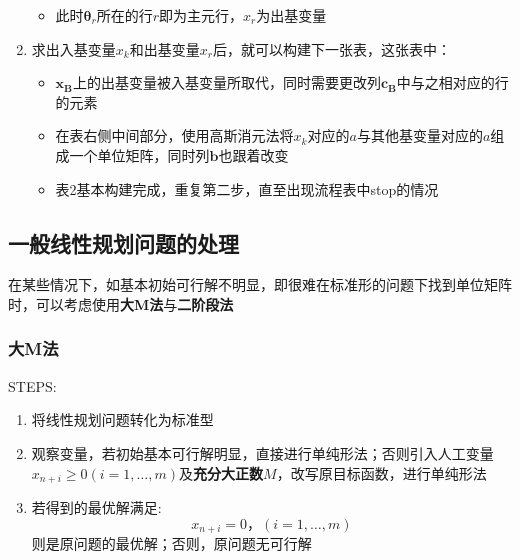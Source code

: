 \documentclass{book}
\begin{document}
\begin{enumerate}
\begin{itemize}
              \item 此时$\boldsymbol{\theta}_r$所在的行$r$即为主元行，$x_r$为出基变量
          \end{itemize}
    \item 求出入基变量$x_k$和出基变量$x_r$后，就可以构建下一张表，这张表中：
          \begin{itemize}
              \item $\boldsymbol{x_B}$上的出基变量被入基变量所取代，同时需要更改列$\boldsymbol{c_B}$中与之相对应的行的元素
              \item 在表右侧中间部分，使用高斯消元法将$x_k$对应的$a$与其他基变量对应的$a$组成一个单位矩阵，同时列$\boldsymbol{b}$也跟着改变
              \item 表2基本构建完成，重复第二步，直至出现流程表中stop的情况
          \end{itemize}
\end{enumerate}

\subsection{一般线性规划问题的处理}

在某些情况下，如基本初始可行解不明显，即很难在标准形的问题下找到单位矩阵时，可以考虑使用\textbf{大M法}与\textbf{二阶段法}

\subsubsection{大M法}
STEPS:
\begin{enumerate}
    \item 将线性规划问题转化为标准型
    \item 观察变量，若初始基本可行解明显，直接进行单纯形法；否则引入人工变量 $x_{n+i} \ge 0 (i = 1 , … ,m)$及\textbf{充分大正数}$M$，改写原目标函数，进行单纯形法
    \item 若得到的最优解满足: $$
              x_{n+i} = 0，(i = 1 , … , m)
          $$则是原问题的最优解；否则，原问题无可行解
\end{enumerate}
\end{document}
